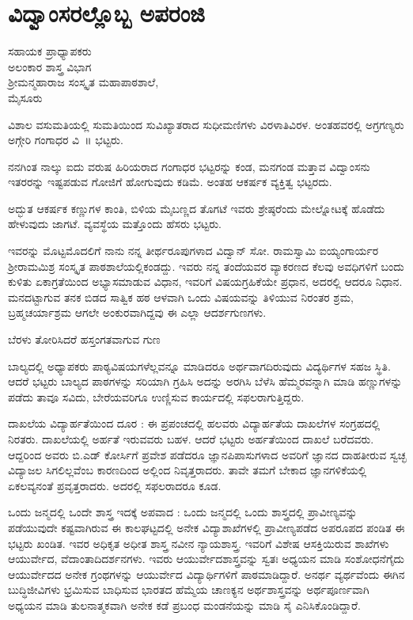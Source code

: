 {\fontsize{14}{16}\selectfont
\chapter{ವಿದ್ವಾಂಸರಲ್ಲೊಬ್ಬ ಅಪರಂಜಿ}

\begin{center}
\smallskip

ಸಹಾಯಕ ಪ್ರಾಧ್ಯಾಪಕರು\\
ಅಲಂಕಾರ ಶಾಸ್ತ್ರ ವಿಭಾಗ\\
ಶ್ರೀಮನ್ಮಹಾರಾಜ ಸಂಸ್ಕೃತ ಮಹಾಪಾಠಶಾಲೆ,\\ 
ಮೈಸೂರು
\addrule
\end{center}

ವಿಶಾಲ ವಸುಮತಿಯಲ್ಲಿ ಸುಮತಿಯಿಂದ ಸುವಿಖ್ಯಾತರಾದ ಸುಧೀಮಣಿಗಳು ವಿರಳಾತಿ\-ವಿರಳ.  ಅಂತಹವರಲ್ಲಿ ಅಗ್ರಗಣ್ಯರು ಅಗ್ಗೇರಿ ಗಂಗಾಧರ ವಿ~॥ ಭಟ್ಟರು.

ನನಗಿಂತ ನಾಲ್ಕು ಐದು ವರುಷ ಹಿರಿಯರಾದ ಗಂಗಾಧರ ಭಟ್ಟರನ್ನು ಕಂಡ, ಮನಗಂಡ ಮತ್ತಾವ ವಿದ್ವಾಂಸನು ಇತರರನ್ನು ಇಷ್ಟಪಡುವ ಗೋಜಿಗೆ ಹೋಗುವುದು ಕಡಿಮೆ.  ಅಂತಹ ಆಕರ್ಷಕ ವ್ಯಕ್ತಿತ್ವ ಭಟ್ಟರದು.

ಅದ್ಭುತ ಆಕರ್ಷಕ ಕಣ್ಣುಗಳ ಕಾಂತಿ, ಬಿಳಿಯ ಮೈಬಣ್ಣದ ತೊಗಟೆ ಇವರು ಶ್ರೇಷ್ಠರೆಂದು  ಮೇಲ್ನೋಟಕ್ಕೆ ಹೊಡೆದು ಹೇಳುವುದು ಜಾಗಟೆ. ವ್ಯವಸ್ಥೆಯ ಮತ್ತೊಂದು ಹೆಸರು ಭಟ್ಟರು.

ಇವರನ್ನು ಮೊಟ್ಟಮೊದಲಿಗೆ ನಾನು ನನ್ನ ತೀರ್ಥರೂಪುಗಳಾದ ವಿದ್ವಾನ್ ಸೋ. ರಾಮಸ್ವಾಮಿ ಐಯ್ಯಂಗಾರ್ಯರ ಶ್ರೀರಾಮಮಿಶ್ರ ಸಂಸ್ಕೃತ ಪಾಠಶಾಲೆಯಲ್ಲಿ\break ಕಂಡದ್ದು.  ಇವರು ನನ್ನ ತಂದೆಯವರ ವ್ಯಾಕರಣದ ಕೆಲವು ಅವಧಿಗಳಿಗೆ ಬಂದು ಕುಳಿತು ಏಕಾಗ್ರತೆಯಿಂದ ಅಭ್ಯಾಸಮಾಡುವ ವಿಧಾನ, ಇವರಿಗೆ ವಿಷಯಗ್ರಹಿಕೆಯೇ ಪ್ರಧಾನ, ಅದರಲ್ಲಿ ಆದರೂ ನಿಧಾನ. ಮನದಟ್ಟಾಗುವ ತನಕ ಬಿಡದ ಸಾತ್ವಿಕ ಹಠ ಆಳವಾಗಿ ಒಂದು ವಿಷಯವನ್ನು ತಿಳಿಯುವ ನಿರಂತರ ಶ್ರಮ, ಬ್ರಹ್ಮಚರ್ಯಾಶ್ರಮ ಆಗಲೇ ಅಂಕುರ\-ವಾಗಿದ್ದವು ಈ ಎಲ್ಲಾ ಆದರ್ಶಗುಣಗಳು.

ಬೆರಳು ತೋರಿಸಿದರೆ ಹಸ್ತಂಗತವಾಗುವ ಗುಣ

ಬಾಲ್ಯದಲ್ಲಿ ಅಧ್ಯಾಪಕರು ಪಾಠ್ಯವಿಷಯಗಳೆಲ್ಲವನ್ನೂ ಮಾಡಿದರೂ ಅರ್ಥವಾಗ\-ದಿರುವುದು ವಿದ್ಯರ್ಥಿಗಳ ಸಹಜ ಸ್ಥಿತಿ.  ಆದರೆ ಭಟ್ಟರು ಬಾಲ್ಯದ ಪಾಠಗಳನ್ನು ಸರಿಯಾಗಿ ಗ್ರಹಿಸಿ ಅದನ್ನು ಅರಗಿಸಿ ಬೆಳೆಸಿ ಹೆಮ್ಮರವನ್ನಾಗಿ ಮಾಡಿ ಹಣ್ಣುಗಳನ್ನು ಪಡೆದು ತಾವೂ ಸವಿದು, ಬೇರೆಯವರಿಗೂ ಉಣ್ಣಿಸುವ ಕಾರ್ಯದಲ್ಲಿ ಸಫಲರಾಗುತ್ತಿದ್ದರು.

ದಾಖಲೆಯ ವಿದ್ಯಾರ್ಹತೆಯಿಂದ ದೂರ :  \enginline{-}   ಈ ಪ್ರಪಂಚದಲ್ಲಿ ಹಲವರು ವಿದ್ಯಾರ್ಹತೆಯ ದಾಖಲೆಗಳ ಸಂಗ್ರಹದಲ್ಲಿ ನಿರತರು.  ದಾಖಲೆಯಲ್ಲಿ ಅರ್ಹತೆ ಇರುವವರು ಬಹಳ.  ಆದರೆ ಭಟ್ಟರು ಅರ್ಹತೆಯಿಂದ ದಾಖಲೆ ಬರೆದವರು.  ಆದ್ದರಿಂದ ಅವರು ಬಿ.ಎಡ್ ಕೋರ್ಸಿಗೆ ಪ್ರವೇಶ ಪಡೆದರೂ ಜ್ಞಾನಪಿಪಾಸುಗಳಾದ ಅವರಿಗೆ ಜ್ಞಾನದ ದಾಹತೀರುವ ಸ್ವಚ್ಛ ವಿದ್ಯಾಜಲ ಸಿಗಲಿಲ್ಲವೆಂಬ ಕಾರಣದಿಂದ ಅಲ್ಲಿಂದ ನಿವೃತ್ತರಾದರು.  ತಾವೇ ತಮಗೆ ಬೇಕಾದ ಜ್ಞಾನಗಳಿಕೆಯಲ್ಲಿ ಏಕಲವ್ಯನಂತೆ ಪ್ರವೃತ್ತರಾದರು.  ಅದರಲ್ಲಿ ಸಫಲ\-ರಾದರೂ ಕೂಡ.

ಒಂದು ಜನ್ಮದಲ್ಲಿ ಒಂದೇ ಶಾಸ್ತ್ರ ಇದಕ್ಕೆ ಅಪವಾದ :  \enginline{-}   ಒಂದು ಜನ್ಮದಲ್ಲಿ ಒಂದು ಶಾಸ್ತ್ರದಲ್ಲಿ ಪ್ರಾವೀಣ್ಯವನ್ನು ಪಡೆಯುವುದೇ ಕಷ್ಟವಾಗಿರುವ ಈ ಕಾಲಘಟ್ಟದಲ್ಲಿ ಅನೇಕ ವಿದ್ಯಾಶಾಖೆಗಳಲ್ಲಿ ಪ್ರಾವೀಣ್ಯಪಡೆದ ಅಪರೂಪದ ಪಂಡಿತ ಈ ಭಟ್ಟರು ಖಂಡಿತ.  ಇವರ ಅಧಿಕೃತ ಅಧೀತ ಶಾಸ್ತ್ರ ನವೀನ ನ್ಯಾಯಶಾಸ್ತ್ರ.  ಇವರಿಗೆ ವಿಶೇಷ ಆಸಕ್ತಿಯಿರುವ ಶಾಖೆಗಳು ಆಯುರ್ವೇದ, ವೆದಾಂತಾದಿದರ್ಶನಗಳು.  ಇವರು ಆಯುರ್ವೇದಶಾಸ್ತ್ರವನ್ನು ಸ್ವತಃ ಅಧ್ಯಯನ ಮಾಡಿ ಸಂಶೋಧನೆಗೈದು ಆಯುರ್ವೇದದ ಅನೇಕ ಗ್ರಂಥಗಳನ್ನು ಆಯುರ್ವೇದ ವಿದ್ಯಾರ್ಥಿಗಳಿಗೆ ಪಾಠಮಾಡಿದ್ದಾರೆ.  ಅನರ್ಥ ವ್ಯರ್ಥವೆಂದು ಈಗಿನ ಬುದ್ಧಿಜೀವಿಗಳು ಭ್ರಮಿಸುವ ಬಾಧಿಸುವ ಭಾರತದ ಹೆಮ್ಮೆಯ ಚಾಣಕ್ಯನ ಅರ್ಥಶಾಸ್ತ್ರವನ್ನು ಅರ್ಥಪೂರ್ಣವಾಗಿ ಅಧ್ಯಯನ ಮಾಡಿ ತುಲನಾತ್ಮಕವಾಗಿ ಅನೇಕ ಕಡೆ ಪ್ರಬಂಧ ಮಂಡನೆಯನ್ನು ಮಾಡಿ ಸೈ ಎನಿಸಿಕೊಂಡಿದ್ದಾರೆ.

}
